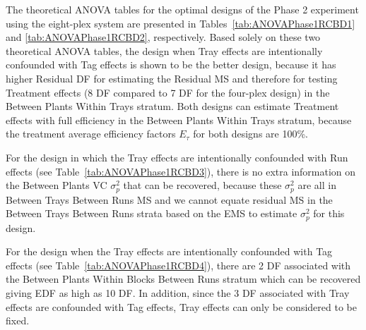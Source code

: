The theoretical ANOVA tables for the optimal designs of the Phase 2 experiment using the eight-plex system are presented in Tables~\ref{tab:ANOVAPhase1RCBD1} and \ref{tab:ANOVAPhase1RCBD2}, respectively. Based solely on these two theoretical ANOVA tables, the design when Tray effects are intentionally confounded with Tag effects is shown to be the better design, because it has higher Residual DF for estimating the Residual MS and therefore for testing Treatment effects (8 DF compared to 7 DF for the four-plex design) in the Between Plants Within Trays stratum. Both designs can estimate Treatment effects with full efficiency in the Between Plants Within Trays stratum, because the treatment average efficiency factors $E_\tau$ for both designs are 100\%. 

For the design in which the Tray effects are intentionally confounded with Run effects (see Table~\ref{tab:ANOVAPhase1RCBD3}), there is no extra information on the Between Plants VC $\sigma_{p}^2$ that can be recovered, because these $\sigma_{p}^2$ are all in Between Trays Between Runs MS and we cannot equate residual MS in the Between Trays Between Runs strata based on the EMS to estimate $\sigma_{p}^2$ for this design. 

For the design when the Tray effects are intentionally confounded with Tag effects (see Table~\ref{tab:ANOVAPhase1RCBD4}), there are 2 DF associated with the Between Plants Within Blocks Between Runs stratum which can be recovered giving EDF as high as 10 DF. In addition, since the 3 DF associated with Tray effects are confounded with Tag effects, Tray effects can only be considered to be fixed.       

